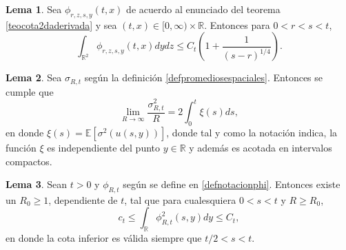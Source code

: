 \documentclass[letterpaper,twoside,12pt]{book}
\newcommand{\R}{\mathbb{R}}
\newcommand{\E}{\mathbb{E}}
\newcommand{\1}{\mathds{1}}
\renewcommand{\to}{\rightarrow}
\theoremstyle{definition}
\theoremstyle{definition}
\theoremstyle{remark}
\theoremstyle{definition}
\theoremstyle{definition}
\theoremstyle{definition}
\theoremstyle{definition}
\theoremstyle{definition}
\newtheorem{lema}{Lema}
\begin{document}
\begin{lema}\label{lemaA.2}
 Sea $\phi_{r,z,s,y}(t,x)$ de acuerdo al enunciado del teorema \ref{teocota2daderivada} y sea $(t,x)\in [0,\infty)\times\R$. Entonces para $0<r<s<t$,
 \[
 \int_{\R^2}\phi_{r,z,s,y}(t,x)dydz\leq C_t \left(1+\frac{1}{(s-r)^{1/4}}\right).
 \]
 \end{lema}
 \begin{lema}\label{lemaA.3a} 
  Sea $\sigma_{R,t}$ según la definición \ref{defpromediosespaciales}. Entonces se cumple que 
  \[
      \lim_{R\to\infty}\frac{\sigma_{R,t}^2}{R}=2\int_{0}^{t}\xi(s)ds,
  \] 
  en donde $\xi(s)=\E\left[\sigma^2(u(s,y))\right]$, donde tal y como la notación indica, la función $\xi$ es independiente del punto $y\in \R$ y además es acotada en intervalos compactos.
  \end{lema}
  \begin{lema}\label{LemaA.4a}
   Sean $t>0$ y $\phi_{R,t}$ según se define en \eqref{defnotacionphi}. Entonces existe un $R_0\geq1$, dependiente de $t$, tal que para cualesquiera $0<s<t$ y $R\geq R_0$,
   \[
      c_t\leq \int_\R\phi_{R,t}^2(s,y)dy\leq C_t,
   \]
   en donde la cota inferior es válida siempre que $t/2<s<t$.
  \end{lema}
\nocite{*}
\backmatter



\end{document}
